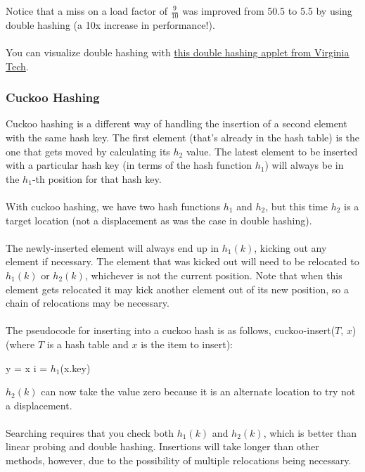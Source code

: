 \documentclass[]{article}
\theoremstyle{definition}
\newcommand{\lecture}[1]{\marginpar{{\footnotesize $\leftarrow$ \underline{#1}}}}
\begin{document}
				Notice that a miss on a load factor of $\frac{9}{10}$ was improved from 50.5 to 5.5 by using double hashing (a 10x increase in performance!).
				\\ \\
				You can visualize double hashing with \href{http://research.cs.vt.edu/AVresearch/hashing/double.php}{this double hashing applet from Virginia Tech}.

				\subsubsection{Cuckoo Hashing}
					Cuckoo hashing is a different way of handling the insertion of a second element with the same hash key. The first element (that's already in the hash table) is the one that gets moved by calculating its $h_2$ value. The latest element to be inserted with a particular hash key (in terms of the hash function $h_1$) will always be in the $h_1$-th position for that hash key.
					\\ \\
					\lecture{March 5, 2013}
					With cuckoo hashing, we have two hash functions $h_1$ and $h_2$, but this time $h_2$ is a target location (not a displacement as was the case in double hashing).
					\\ \\
					The newly-inserted element will always end up in $h_1(k)$, kicking out any element if necessary. The element that was kicked out will need to be relocated to $h_1(k)$ or $h_2(k)$, whichever is not the current position. Note that when this element gets relocated it may kick another element out of its new position, so a chain of relocations may be necessary.
					\\ \\
					The pseudocode for inserting into a cuckoo hash is as follows, cuckoo-insert($T$, $x$) (where $T$ is a hash table and $x$ is the item to insert): \\
					\begin{algorithm}[H]
						y = x\;
						i = $h_1$(x.key)\;
					\end{algorithm}

					$h_2(k)$ can now take the value zero because it is an alternate location to try \textendash{} not a displacement.
					\\ \\
					Searching requires that you check both $h_1(k)$ and $h_2(k)$, which is better than linear probing and double hashing. Insertions will take longer than other methods, however, due to the possibility of multiple relocations being necessary.
\end{document}
